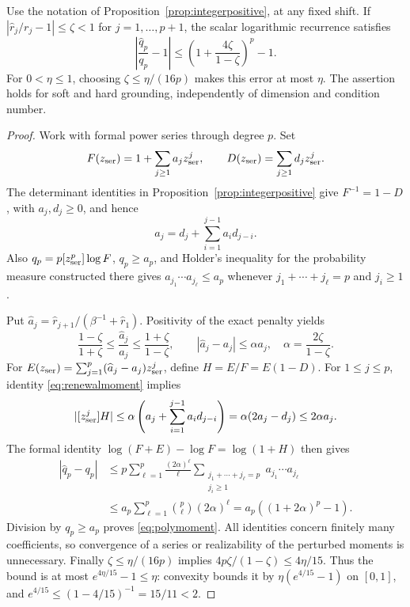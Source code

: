 \begin{theorem}
\label{thm:polymoment}
Use the notation of Proposition~\ref{prop:integerpositive}, at any
fixed shift. If $|\widehat r_j/r_j-1|\leq\zeta<1$ for
$j=1,\ldots,p+1$, the scalar logarithmic recurrence satisfies
\begin{equation}\label{eq:polymoment}
 \left|\frac{\widehat q_p}{q_p}-1\right|
 \leq \left(1+\frac{4\zeta}{1-\zeta}\right)^p-1.
\end{equation}
For $0<\eta\leq1$, choosing $\zeta\leq\eta/(16p)$ makes this
error at most $\eta$. The assertion holds for soft and hard grounding,
independently of dimension and condition number.
\end{theorem}
\begin{proof}
Work with formal power series through degree $p$. Set
\[
 F(z_{\rm ser})=1+\sum_{j\geq1}a_jz_{\rm ser}^j,\qquad
 D(z_{\rm ser})=\sum_{j\geq1}d_jz_{\rm ser}^j.
\]
The determinant identities in Proposition~\ref{prop:integerpositive}
give $F^{-1}=1-D$, with $a_j,d_j\geq0$, and hence
\begin{equation}\label{eq:renewalmoment}
 a_j=d_j+\sum_{i=1}^{j-1}a_i d_{j-i}.
\end{equation}
Also $q_p=p[z_{\rm ser}^p]\log F$, $q_p\geq a_p$, and Holder's inequality
for the probability measure constructed there gives
$a_{j_1}\cdots a_{j_\ell}\leq a_p$ whenever
$j_1+\cdots+j_\ell=p$ and $j_i\geq1$.

Put $\widehat a_j=\widehat r_{j+1}/(\beta^{-1}+\widehat r_1)$.
Positivity of the exact penalty yields
\[
 \frac{1-\zeta}{1+\zeta}\leq\frac{\widehat a_j}{a_j}
 \leq\frac{1+\zeta}{1-\zeta},\qquad
 |\widehat a_j-a_j|\leq\alpha a_j,\quad
 \alpha=\frac{2\zeta}{1-\zeta}.
\]
For $E(z_{\rm ser})=\sum_{j=1}^p(\widehat a_j-a_j)z_{\rm ser}^j$, define
$H=E/F=E(1-D)$. For $1\leq j\leq p$, identity
\eqref{eq:renewalmoment} implies
\[
 |[z_{\rm ser}^j]H|\leq\alpha\left(a_j+
          \sum_{i=1}^{j-1}a_i d_{j-i}\right)
 =\alpha(2a_j-d_j)\leq2\alpha a_j.
\]
The formal identity $\log(F+E)-\log F=\log(1+H)$ then gives
\begin{align*}
 |\widehat q_p-q_p|
 &\leq p\sum_{\ell=1}^p\frac{(2\alpha)^\ell}{\ell}
   \sum_{\substack{j_1+\cdots+j_\ell=p\\j_i\geq1}}
            a_{j_1}\cdots a_{j_\ell}\\
 &\leq a_p\sum_{\ell=1}^p\binom p\ell(2\alpha)^\ell
 =a_p((1+2\alpha)^p-1).
\end{align*}
Division by $q_p\geq a_p$ proves \eqref{eq:polymoment}.
All identities concern finitely many coefficients, so convergence
of a series or realizability of the perturbed moments is unnecessary.
Finally $\zeta\leq\eta/(16p)$ implies
$4p\zeta/(1-\zeta)\leq4\eta/15$.
Thus the bound is at most $e^{4\eta/15}-1\leq\eta$:
convexity bounds it by $\eta(e^{4/15}-1)$ on $[0,1]$, and
$e^{4/15}\leq(1-4/15)^{-1}=15/11<2$.
\end{proof}

